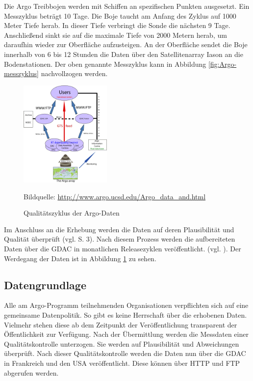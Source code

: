     Die Argo Treibbojen werden mit Schiffen an spezifischen Punkten ausgesetzt. Ein Messzyklus beträgt 10 Tage. Die Boje taucht am Anfang des Zyklus auf 1000 Meter Tiefe herab.  In dieser Tiefe verbringt die Sonde die nächsten 9 Tage. Anschließend sinkt sie auf die maximale Tiefe von 2000 Metern herab, um daraufhin wieder zur Oberfläche aufzusteigen. An der Oberfläche sendet die Boje innerhalb von 6 bis 12 Stunden die Daten über den Satellitenarray Iason an die Bodenstationen. Der oben genannte Messzyklus kann in Abbildung \ref{fig:Argo-messzyklus} nachvollzogen werden.

    \begin{figure}[!ht]
        \centering
        \includegraphics[width=0.4\textwidth]{pix/RT-Data-flow}
        \caption[Qualitätszyklus der Argo-Daten]{Qualitätszyklus der Argo-Daten}
        \footnotesize{
            Bildquelle: \url{http://www.argo.ucsd.edu/Argo_data_and.html}
        }


        \label{fig:argo_dataflow}
    \end{figure}

    Im Anschluss an die Erhebung werden die Daten auf deren Plausibilität und Qualität überprüft (vgl. \cite{ArgoDataBeginnersGuide} S. 3). Nach diesem Prozess werden die aufbereiteten Daten über die \gls{GDAC} in monatlichen Releasezyklen veröffentlicht. (vgl. \cite{Argofloa92:online}). Der Werdegang der Daten ist in Abbildung \ref{fig:argo_dataflow} zu sehen.

\subsection{Datengrundlage}


    Alle am Argo-Programm teilnehmenden Organisationen verpflichten sich auf eine gemeinsame Datenpolitik. So gibt es keine Herrschaft über die erhobenen Daten. Vielmehr stehen diese ab dem Zeitpunkt der Veröffentlichung transparent der Öffentlichkeit zur Verfügung.
    Nach der Übermittlung werden die Messdaten einer Qualitätskontrolle unterzogen. Sie werden auf Plausibilität und Abweichungen überprüft. Nach dieser Qualitätskontrolle werden die Daten nun über die \gls{GDAC} in Frankreich und den USA veröffentlicht. Diese können über \gls{HTTP} und \gls{FTP} abgerufen werden.

